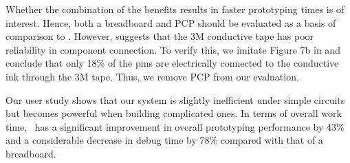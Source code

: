 Whether the combination of the benefits results in faster prototyping times is of interest. Hence, both a breadboard and PCP should be evaluated as a basis of comparison to \papertitle. However, \cite{Circuit_Stickers} suggests that the 3M conductive tape has poor reliability in component connection. To verify this, we imitate Figure 7b in \cite{Instant_Inkjet_Circuits} and conclude that only 18\% of the pins are electrically connected to the conductive ink through the 3M tape. Thus, we remove PCP from our evaluation.

Our user study shows that our system is slightly inefficient under simple circuits but becomes powerful when building complicated ones. In terms of overall work time, \papertitle\ has a significant improvement in overall prototyping performance by 43\% and a considerable decrease in debug time by 78\% compared with that of a breadboard.



